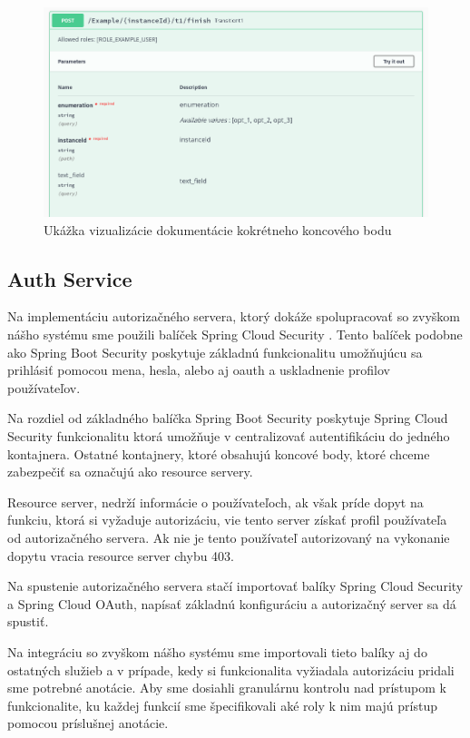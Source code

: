\begin{figure}[!htbp]
	\centering
	\includegraphics[width=16cm]{img/swagger_ui_endpoint.png}
	\caption{Ukážka vizualizácie dokumentácie kokrétneho koncového bodu}
	\label{swagger_ui_endpoint}
\end{figure}



\subsection{Auth Service}  \label{section_auth}

Na implementáciu autorizačného servera, ktorý dokáže spolupracovať so zvyškom nášho systému sme použili balíček Spring Cloud Security \cite{cloud_security}. Tento balíček podobne ako Spring Boot Security poskytuje základnú funkcionalitu umožňujúcu sa prihlásiť pomocou mena, hesla, alebo aj \acrshort{oauth} a uskladnenie profilov používateľov.

Na rozdiel od základného balíčka Spring Boot Security poskytuje Spring Cloud Security funkcionalitu ktorá umožňuje v centralizovať autentifikáciu do jedného kontajnera. Ostatné kontajnery, ktoré obsahujú koncové body, ktoré chceme zabezpečiť sa označujú ako resource servery.

Resource server, nedrží informácie o používateľoch, ak však príde dopyt na funkciu, ktorá si vyžaduje autorizáciu, vie tento server získať profil používateľa od autorizačného servera. Ak nie je tento používateľ autorizovaný na vykonanie dopytu vracia resource server chybu 403.

Na spustenie autorizačného servera stačí importovať balíky  Spring Cloud Security a Spring Cloud OAuth, napísať základnú konfiguráciu a autorizačný server sa dá spustiť.

Na integráciu so zvyškom nášho systému sme importovali tieto balíky aj do ostatných služieb a v prípade, kedy si funkcionalita vyžiadala autorizáciu  pridali sme potrebné anotácie. Aby sme dosiahli granulárnu kontrolu nad prístupom k funkcionalite, ku každej funkcií sme špecifikovali aké roly k nim majú prístup pomocou príslušnej anotácie.

